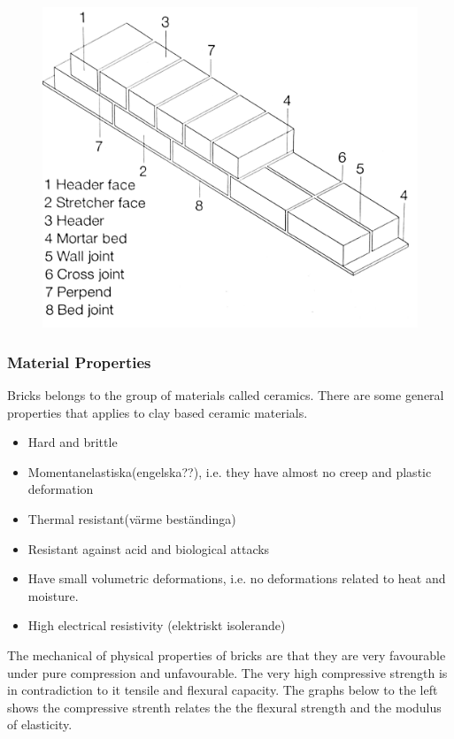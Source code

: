 \begin{figure}[H]
\centering
\includegraphics[width=0.6\linewidth ]{figure/Introduction/brickterm.pdf}
\caption{\cite{ref:Pfeifer}}
\end{figure}




\subsubsection{Material Properties}

Bricks belongs to the group of materials called ceramics. There are some general properties that applies to clay based ceramic materials.\cite{ref:byggmaterial} \\

\begin{itemize}
\item Hard and brittle
\item Momentanelastiska(engelska??),
i.e. they have almost no creep and plastic deformation
\item Thermal resistant(värme beständinga)
\item Resistant against acid and biological attacks
\item Have small volumetric deformations,
i.e. no deformations related to heat and moisture.
\item High electrical resistivity  (elektriskt isolerande)
\end{itemize}

The mechanical of physical properties of bricks are that they are very favourable under pure compression and unfavourable. The very high compressive strength is in contradiction to it tensile and flexural capacity. The graphs below to the left shows the compressive strenth relates the the flexural strength and the modulus of elasticity.  


